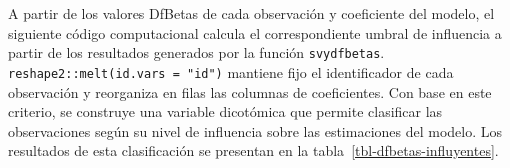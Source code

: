 \documentclass[
  spanish,
  11pt,
  letterpaper,
  oneside,
  open=any]{scrbook}
\newenvironment{Shaded}{\begin{snugshade}}{\end{snugshade}}
\newcommand{\AttributeTok}[1]{\textcolor[rgb]{0.40,0.45,0.13}{#1}}
\newcommand{\DecValTok}[1]{\textcolor[rgb]{0.68,0.00,0.00}{#1}}
\newcommand{\FunctionTok}[1]{\textcolor[rgb]{0.28,0.35,0.67}{#1}}
\newcommand{\NormalTok}[1]{\textcolor[rgb]{0.00,0.23,0.31}{#1}}
\newcommand{\OtherTok}[1]{\textcolor[rgb]{0.00,0.23,0.31}{#1}}
\newcommand{\SpecialCharTok}[1]{\textcolor[rgb]{0.37,0.37,0.37}{#1}}
\newcommand{\StringTok}[1]{\textcolor[rgb]{0.13,0.47,0.30}{#1}}
\begin{document}
A partir de los valores DfBetas de cada observación y coeficiente del
modelo, el siguiente código computacional calcula el correspondiente
umbral de influencia a partir de los resultados generados por la función
\texttt{svydfbetas}. \texttt{reshape2::melt(id.vars\ =\ "id")} mantiene
fijo el identificador de cada observación y reorganiza en filas las
columnas de coeficientes. Con base en este criterio, se construye una
variable dicotómica que permite clasificar las observaciones según su
nivel de influencia sobre las estimaciones del modelo. Los resultados de
esta clasificación se presentan en la
tabla~\ref{tbl-dfbetas-influyentes}.

\begin{Shaded}
\end{Shaded}
\end{document}
